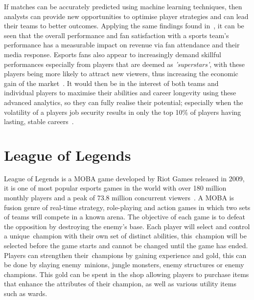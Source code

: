 If matches can be accurately predicted using machine learning techniques, then analysts can provide new opportunities to optimise player strategies and can lead their teams to better outcomes.
Applying the same findings found in~\citet{gray2012customer}, it can be seen that the overall performance and fan satisfaction with a sports team's performance has a measurable impact on revenue via fan attendance and their media response.
Esports fans also appear to increasingly demand skillful performances especially from players that are deemed as \emph{'superstars'}, with these players being more likely to attract new viewers, thus increasing the economic gain of the market~\citep{mangeloja2019economics, ward2019esport}.
It would then be in the interest of both teams and individual players to maximise their abilities and career longevity using these advanced analytics, so they can fully realise their potential;
especially when the volatility of a players job security results in only the top 10\% of players having lasting, stable careers~\citep{ward2019esport}.\\


\section{League of Legends}\label{sec:League of Legends}
League of Legends is a \ac{MOBA} game developed by Riot Games released in 2009, it is one of most popular esports games in the world with over 180 million monthly players and a peak of 73.8 million concurrent viewers~\citep{riotplayercount, upcomerworld2021}.
A \ac{MOBA} is fusion genre of real-time strategy, role-playing and action games in which two sets of teams will compete in a known arena.
The objective of each game is to defeat the opposition by destroying the enemy's base.
Each player will select and control a unique~\gls{champion} with their own set of distinct abilities, this~\gls{champion} will be selected before the game starts and cannot be changed until the game has ended.
Players can strengthen their~\glspl{champion} by gaining experience and gold, this can be done by slaying enemy~\glspl{minion}, \gls{jungle} monsters, enemy structures or enemy \glspl{champion}.
This gold can be spent in the shop allowing players to purchase items that enhance the attributes of their \gls{champion}, as well as various utility items such as \glspl{ward}.\\

